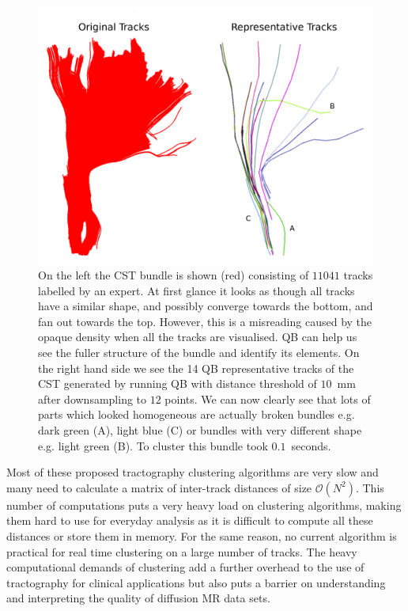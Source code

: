 \documentclass[journal]{IEEEtran}
\begin{document}
%
\begin{figure}[ht]
\begin{centering}
\includegraphics[scale=0.26]{Fig_4_cst_simplification_relabeled}
\par\end{centering}
\caption{On the left the CST bundle is shown (red) consisting of $11041$
  tracks labelled by an expert. At first glance
  it looks as though all tracks have a similar shape, and possibly
  converge towards the bottom, and fan out towards the top. However,
  this is a misreading caused by the opaque density when all the tracks
  are visualised.  QB can help us see the fuller structure of the bundle
  and identify its elements. On the right hand side we see the 14 QB
  representative tracks of the CST generated by running QB with distance
  threshold of $10$~mm after downsampling to $12$ points. We can now
  clearly see that lots of parts which looked homogeneous are actually
  broken bundles e.g. dark green (A), light blue (C) or bundles with
  very different shape e.g. light green (B). To cluster
  this bundle took $0.1$~seconds.\label{Flo:cst_pbc}}
\end{figure}

Most of these proposed tractography clustering algorithms are very slow and many
need to calculate a matrix of inter-track distances of size $\mathcal{O}(N^2)$.
This number of computations puts a very heavy load on clustering algorithms,
making them hard to use for everyday analysis as it is difficult to compute all
these distances or store them in memory. For the same reason, no current
algorithm is practical for real time clustering on a large number of tracks. The
heavy computational demands of clustering add a further overhead to the use of
tractography for clinical applications but also puts a barrier on understanding
and interpreting the quality of diffusion MR data sets.
\end{document}
